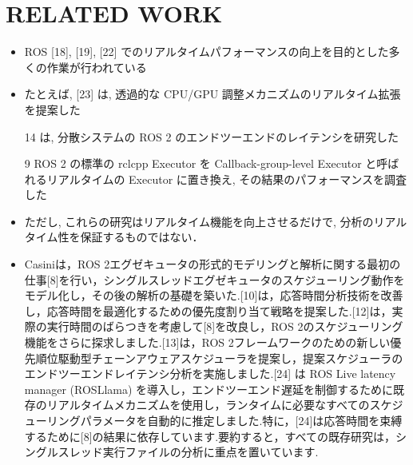 
\section{RELATED WORK}
\label{sec: related work}


\begin{frame}{}
    \begin{itemize}
        \item ROS [18], [19], [22] でのリアルタイムパフォーマンスの向上を目的とした多くの作業が行われている
\item たとえば, [23] は, 透過的な CPU/GPU 調整メカニズムのリアルタイム拡張を提案した
\item [14] は, 分散システムの ROS 2 のエンドツーエンドのレイテンシを研究した
\item [9] ROS 2 の標準の rclcpp Executor を Callback-group-level Executor と呼ばれるリアルタイムの Executor に置き換え, その結果のパフォーマンスを調査した
\item ただし, これらの研究はリアルタイム機能を向上させるだけで, 分析のリアルタイム性を保証するものではない．
    \end{itemize}
\end{frame}

\begin{frame}{}
    \begin{itemize}
        \item Casiniは，ROS 2エグゼキュータの形式的モデリングと解析に関する最初の仕事[8]を行い，シングルスレッドエグゼキュータのスケジューリング動作をモデル化し，その後の解析の基礎を築いた.[10]は，応答時間分析技術を改善し，応答時間を最適化するための優先度割り当て戦略を提案した.[12]は，実際の実行時間のばらつきを考慮して[8]を改良し，ROS 2のスケジューリング機能をさらに探求しました.[13]は，ROS 2フレームワークのための新しい優先順位駆動型チェーンアウェアスケジューラを提案し，提案スケジューラのエンドツーエンドレイテンシ分析を実施しました.[24] は ROS Live latency manager (ROSLlama) を導入し，エンドツーエンド遅延を制御するために既存のリアルタイムメカニズムを使用し，ランタイムに必要なすべてのスケジューリングパラメータを自動的に推定しました.特に，[24]は応答時間を束縛するために[8]の結果に依存しています.要約すると，すべての既存研究は，シングルスレッド実行ファイルの分析に重点を置いています.
    \end{itemize}
\end{frame}

